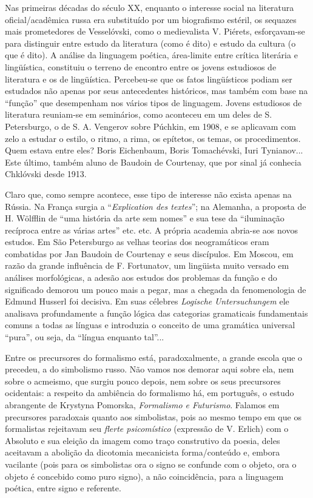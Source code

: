 Nas primeiras décadas do século XX, enquanto o interesse social na
literatura oficial/acadêmica russa era substituído por um biografismo
estéril, os sequazes mais prometedores de Vesselóvski, como o
medievalista V. Piérets, esforçavam-se para distinguir entre estudo da
literatura (como é dito) e estudo da cultura (o que é dito). A análise
da linguagem poética, área-limite entre crítica literária e lingüística,
constituiu o terreno de encontro entre os jovens estudiosos de
literatura e os de lingüística. Percebeu-se que os fatos lingüísticos
podiam ser estudados não apenas por seus antecedentes históricos, mas
também com base na ``função'' que desempenham nos vários tipos de
linguagem. Jovens estudiosos de literatura reuniam-se em seminários,
como aconteceu em um deles de S. Petersburgo, o de S. A. Vengerov sobre
Púchkin, em 1908, e se aplicavam com zelo a estudar o estilo, o ritmo, a
rima, os epítetos, os temas, os procedimentos. Quem estava entre eles?
Boris Eichenbaum, Boris Tomachévski, Iuri Tynianov... Este último,
também aluno de Baudoin de Courtenay, que por sinal já conhecia
Chklóvski desde 1913.

Claro que, como sempre acontece, esse tipo de interesse não exista
apenas na Rússia. Na França surgia a ``\emph{Explication des textes}'';
na Alemanha, a proposta de H. Wölfflin de ``uma história da arte sem
nomes'' e sua tese da ``iluminação recíproca entre as várias artes''
etc. etc. A própria academia abria-se aos novos estudos. Em São
Petersburgo as velhas teorias dos neogramáticos eram combatidas por Jan
Baudoin de Courtenay e seus discípulos. Em Moscou, em razão da grande
influência de F. Fortunatov, um lingüista muito versado em análises
morfológicas, a adesão aos estudos dos problemas da função e do
significado demorou um pouco mais a pegar, mas a chegada da
fenomenologia de Edmund Husserl foi decisiva. Em suas célebres
\emph{Logische} \emph{Untersuchungem} ele analisava profundamente a
função lógica das categorias gramaticais fundamentais comuns a todas as
línguas e introduzia o conceito de uma gramática universal ``pura'', ou
seja, da ``língua enquanto tal''...

Entre os precursores do formalismo está, paradoxalmente, a grande escola
que o precedeu, a do simbolismo russo. Não vamos nos demorar aqui sobre
ela, nem sobre o acmeismo, que surgiu pouco depois, nem sobre os seus
precursores ocidentais: a respeito da ambiência do formalismo há, em
português, o estudo abrangente de Krystyna Pomorska, \emph{Formalismo e
Futurismo}. Falamos em precursores paradoxais quanto aos simbolistas,
pois ao mesmo tempo em que os formalistas rejeitavam seu \emph{flerte
psicomístico} (expressão de V. Erlich) com o Absoluto e sua eleição da
imagem como traço construtivo da poesia, deles aceitavam a abolição da
dicotomia mecanicista forma/conteúdo e, embora vacilante (pois para os
simbolistas ora o signo se confunde com o objeto, ora o objeto é
concebido como puro signo), a não coincidência, para a linguagem
poética, entre signo e referente.

